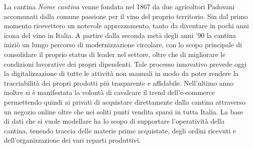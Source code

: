 La cantina \emph{Nome cantina} venne fondata nel 1867 da due agricoltori Padovani accomunati dalla comune passione per il vino del proprio territorio. Sin dal primo momento ricevettero un notevole apprezzamento, tanto da diventare in pochi anni icona del vino in Italia. A partire dalla seconda metà degli anni '90 la cantina iniziò un lungo percorso di modernizzazione circolare, con lo scopo principale di consolidare il proprio status di leader nel settore, oltre che di migliorare le condizioni lavorative dei propri dipendenti. Tale processo innovativo prevede oggi la digitalizzazione di tutte le attività non manuali in modo da poter rendere la tracciabilità dei propri prodotti più trasparente e affidabile. Nell'ultimo anno inoltre si è manifestata la volontà di cavalcare il trend dell'e-commerce permettendo quindi ai privati di acquistare direttamente dalla cantina attraverso un negozio online oltre che nei soliti punti vendita sparsi in tutta Italia. La base di dati che si vuole modellare ha lo scopo di supportare l'operatività della cantina, tenendo traccia delle materie prime acquistate, degli ordini ricevuti e dell'organizzazione dei vari reparti produttivi.